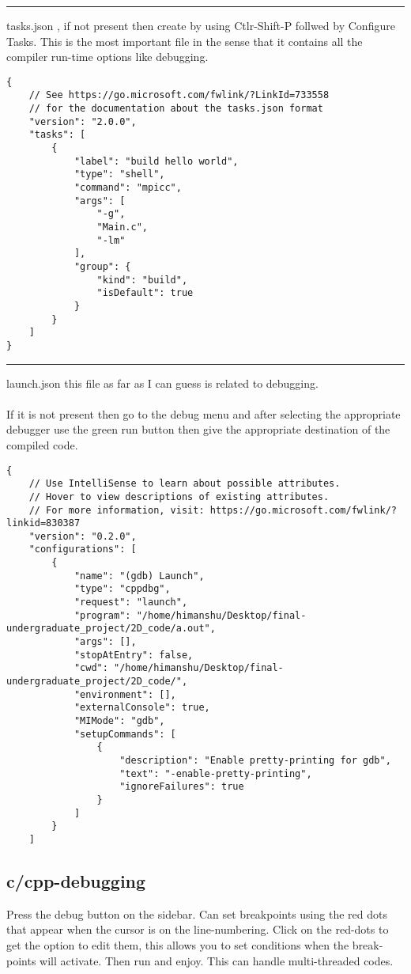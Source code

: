 \bigbreak
\noindent\rule{\textwidth}{1pt}
\bigbreak
\noindent
tasks.json , if not present then create by using Ctlr-Shift-P follwed by Configure Tasks.
This is the most important file in the sense that it contains all the compiler run-time options like debugging.

\begin{lstlisting}
{
    // See https://go.microsoft.com/fwlink/?LinkId=733558
    // for the documentation about the tasks.json format
    "version": "2.0.0",
    "tasks": [
        {
            "label": "build hello world",
            "type": "shell",
            "command": "mpicc",
            "args": [
                "-g",
                "Main.c",
                "-lm"
            ],
            "group": {
                "kind": "build",
                "isDefault": true
            }
        }
    ]
}
\end{lstlisting}


\bigbreak
\noindent\rule{\textwidth}{1pt}
\bigbreak


\noindent
launch.json this file as far as I can guess is related to debugging.
\\
\\
If it is not present then go to the debug menu and after selecting the appropriate debugger use the green run button then give the appropriate destination of the compiled code.

\begin{lstlisting}
{
    // Use IntelliSense to learn about possible attributes.
    // Hover to view descriptions of existing attributes.
    // For more information, visit: https://go.microsoft.com/fwlink/?linkid=830387
    "version": "0.2.0",
    "configurations": [
        {
            "name": "(gdb) Launch",
            "type": "cppdbg",
            "request": "launch",
            "program": "/home/himanshu/Desktop/final-undergraduate_project/2D_code/a.out",
            "args": [],
            "stopAtEntry": false,
            "cwd": "/home/himanshu/Desktop/final-undergraduate_project/2D_code/",
            "environment": [],
            "externalConsole": true,
            "MIMode": "gdb",
            "setupCommands": [
                {
                    "description": "Enable pretty-printing for gdb",
                    "text": "-enable-pretty-printing",
                    "ignoreFailures": true
                }
            ]
        }
    ]
\end{lstlisting}

\subsection{c/cpp-debugging}

Press the debug button on the sidebar. Can set breakpoints using the red dots that appear when the cursor is on the line-numbering. Click on the red-dots to get the option to edit them, this allows you to set conditions when the break-points will activate. Then run and enjoy. This can handle multi-threaded codes.



